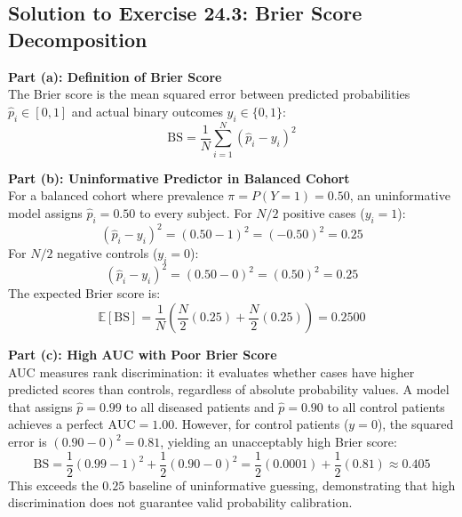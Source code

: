 \documentclass[11pt,twoside,openright]{book}
\begin{document}
\subsection{Solution to Exercise 24.3: Brier Score Decomposition}

\noindent
\textbf{Part (a): Definition of Brier Score}\\
The Brier score is the mean squared error between predicted probabilities $\hat{p}_i \in [0, 1]$ and actual binary outcomes $y_i \in \{0, 1\}$:
\begin{equation}
\text{BS} = \frac{1}{N} \sum_{i=1}^{N} (\hat{p}_i - y_i)^2
\end{equation}

\noindent
\textbf{Part (b): Uninformative Predictor in Balanced Cohort}\\
For a balanced cohort where prevalence $\pi = P(Y = 1) = 0.50$, an uninformative model assigns $\hat{p}_i = 0.50$ to every subject. For $N/2$ positive cases ($y_i = 1$):
\begin{equation}
(\hat{p}_i - y_i)^2 = (0.50 - 1)^2 = (-0.50)^2 = 0.25
\end{equation}
For $N/2$ negative controls ($y_i = 0$):
\begin{equation}
(\hat{p}_i - y_i)^2 = (0.50 - 0)^2 = (0.50)^2 = 0.25
\end{equation}
The expected Brier score is:
\begin{equation}
\mathbb{E}[\text{BS}] = \frac{1}{N} \left( \frac{N}{2}(0.25) + \frac{N}{2}(0.25) \right) = 0.2500
\end{equation}

\noindent
\textbf{Part (c): High AUC with Poor Brier Score}\\
AUC measures rank discrimination: it evaluates whether cases have higher predicted scores than controls, regardless of absolute probability values. A model that assigns $\hat{p} = 0.99$ to all diseased patients and $\hat{p} = 0.90$ to all control patients achieves a perfect $\text{AUC} = 1.00$. However, for control patients ($y = 0$), the squared error is $(0.90 - 0)^2 = 0.81$, yielding an unacceptably high Brier score:
\begin{equation}
\text{BS} = \frac{1}{2}(0.99 - 1)^2 + \frac{1}{2}(0.90 - 0)^2 = \frac{1}{2}(0.0001) + \frac{1}{2}(0.81) \approx 0.405
\end{equation}
This exceeds the $0.25$ baseline of uninformative guessing, demonstrating that high discrimination does not guarantee valid probability calibration.
\end{document}
